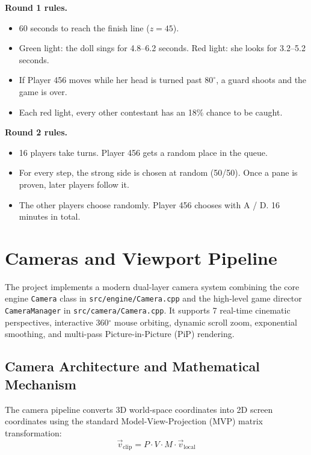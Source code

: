 \documentclass[11pt,a4paper]{article}
\newcommand{\keybox}[1]{\colorbox{rowgray}{\ttfamily #1}}
\begin{document}
\textbf{Round 1 rules.}
\begin{itemize}
  \item 60 seconds to reach the finish line ($z=45$).
  \item Green light: the doll sings for 4.8--6.2 seconds. Red light: she looks for 3.2--5.2 seconds.
  \item If Player 456 moves while her head is turned past $80^\circ$, a guard shoots and the game is over.
  \item Each red light, every other contestant has an 18\% chance to be caught.
\end{itemize}

\textbf{Round 2 rules.}
\begin{itemize}
  \item 16 players take turns. Player 456 gets a random place in the queue.
  \item For every step, the strong side is chosen at random (50/50). Once a pane is proven, later players follow it.
  \item The other players choose randomly. Player 456 chooses with \keybox{A} / \keybox{D}. 16 minutes in total.
\end{itemize}

\section{Cameras and Viewport Pipeline}\label{sec:cameras}
The project implements a modern dual-layer camera system combining the core engine
\texttt{Camera} class in \texttt{src/engine/Camera.cpp} and the high-level game director
\texttt{CameraManager} in \texttt{src/camera/Camera.cpp}. It supports 7 real-time cinematic perspectives,
interactive 360$^\circ$ mouse orbiting, dynamic scroll zoom, exponential smoothing, and multi-pass
Picture-in-Picture (PiP) rendering.

\subsection{Camera Architecture and Mathematical Mechanism}
The camera pipeline converts 3D world-space coordinates into 2D screen coordinates using the standard
Model-View-Projection (MVP) matrix transformation:
\begin{equation}
\vec{v}_{\text{clip}} = P \cdot V \cdot M \cdot \vec{v}_{\text{local}}
\end{equation}
\end{document}

